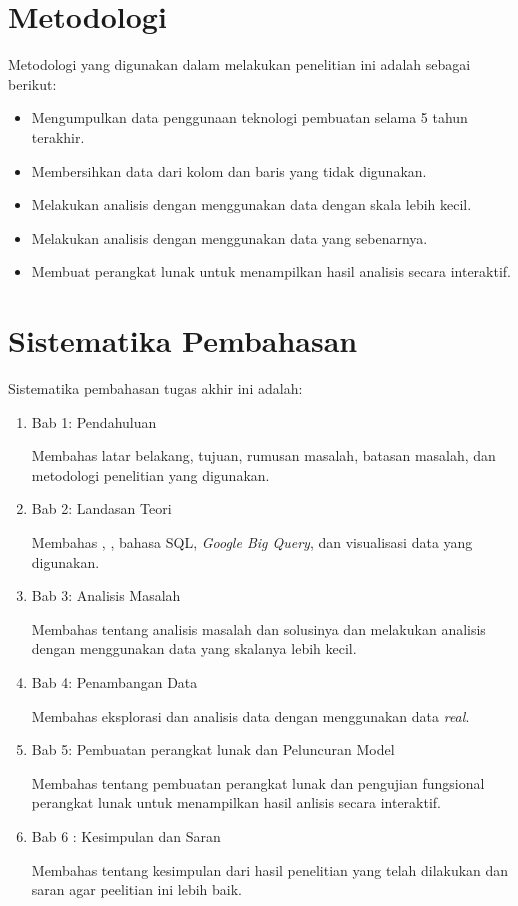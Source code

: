 \section{Metodologi}
\label{sec:metlit}
Metodologi yang digunakan dalam melakukan penelitian ini adalah sebagai berikut:
\begin{itemize}
    \item Mengumpulkan data penggunaan teknologi pembuatan \web selama 5 tahun terakhir.
    \item Membersihkan data dari kolom dan baris yang tidak digunakan.
    \item Melakukan analisis dengan menggunakan data dengan skala lebih kecil.
    \item Melakukan analisis dengan menggunakan data yang sebenarnya.
    \item Membuat perangkat lunak untuk menampilkan hasil analisis secara interaktif.
\end{itemize}

\section{Sistematika Pembahasan}
\label{sec:sispem}
Sistematika pembahasan tugas akhir ini adalah:
\begin{enumerate}
    \item Bab 1: Pendahuluan
   
    Membahas latar belakang, tujuan, rumusan masalah, batasan masalah, dan metodologi penelitian yang digunakan.
    
    \item Bab 2: Landasan Teori

    Membahas \web, \http, bahasa SQL, \textit{Google Big Query}, dan visualisasi data yang digunakan.

    \item Bab 3: Analisis Masalah

    Membahas tentang analisis masalah dan solusinya dan melakukan analisis dengan menggunakan data yang skalanya lebih kecil.

    \item Bab 4: Penambangan Data
    
    Membahas eksplorasi dan analisis data dengan menggunakan data \textit{real}.

    \item Bab 5: Pembuatan perangkat lunak dan Peluncuran Model

    Membahas tentang pembuatan perangkat lunak dan pengujian fungsional perangkat lunak untuk menampilkan hasil anlisis secara interaktif.

    \item Bab 6 : Kesimpulan dan Saran

    Membahas tentang kesimpulan dari hasil penelitian yang telah dilakukan dan saran agar peelitian ini lebih baik.
\end{enumerate}
